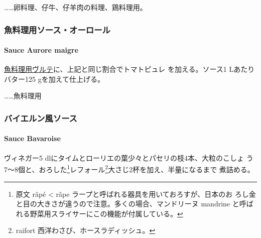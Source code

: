 \begin{recette}
\ldots{}\ldots{}卵料理、仔牛、仔羊肉の料理、鶏料理用。

\maeaki

\hypertarget{ux9b5aux6599ux7406ux7528ux30bdux30fcux30b9ux30aaux30fcux30edux30fcux30eb}{%
\subsubsection{魚料理用ソース・オーロール}\label{ux9b5aux6599ux7406ux7528ux30bdux30fcux30b9ux30aaux30fcux30edux30fcux30eb}}

\hypertarget{sauce-aurore-maigre}{%
\paragraph{Sauce Aurore maigre}\label{sauce-aurore-maigre}}


\protect\hyperlink{veloute-de-poisson}{魚料理用ヴルテ}に、上記と同じ割合でトマトピュレ
を加える。ソース1 Lあたりバター125 gを加えて仕上げる。

\ldots{}\ldots{}魚料理用

\maeaki

\hypertarget{ux30d0ux30a4ux30a8ux30ebux30f3ux98a8ux30bdux30fcux30b9}{%
\subsubsection{バイエルン風ソース}\label{ux30d0ux30a4ux30a8ux30ebux30f3ux98a8ux30bdux30fcux30b9}}

\hypertarget{sauce-bavaroise}{%
\paragraph{Sauce Bavaroise}\label{sauce-bavaroise}}


ヴィネガー5 dlにタイムとローリエの葉少々とパセリの枝4本、大粒のこしょ
う7〜8個と、おろした\footnote{原文 râpé \textless{} râpe
  ラープと呼ばれる器具を用いておろすが、日本のお
  ろし金と目の大きさが違うので注意。多くの場合、マンドリーヌ mandrine
  と呼ばれる野菜用スライサーにこの機能が付属している。}レフォール\footnote{raifort
  西洋わさび、ホースラディッシュ。}大さじ2杯を加え、半量になるまで
煮詰める。


\end{recette}
